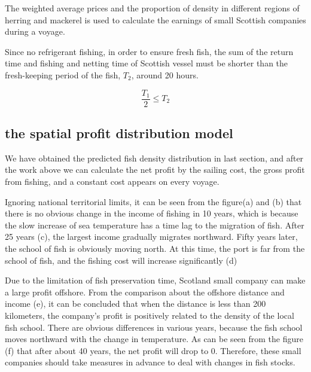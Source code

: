 \documentclass{mcmthesis}
\begin{document}
The weighted average prices and the proportion of density in different regions of herring and mackerel  is used to calculate the earnings of small Scottish companies during a voyage. 

Since no refrigerant fishing, in order to ensure fresh fish, the sum of the return time and fishing and netting time  of Scottish vessel must be shorter than the fresh-keeping period of the fish, $T_2$, around 20 hours.

\begin{equation}\label{10}
\frac{T_1}{2}\leq T_2
\end{equation}



\subsection{the spatial profit distribution model}
  We have obtained the predicted fish density distribution in last section, and after the work above we can calculate the net profit by the sailing cost, the gross profit from fishing, and a constant cost appears on every voyage.
  
Ignoring national territorial limits, it can be seen from the figure(a) and (b) that there is no obvious change in the income of fishing in 10 years, which is because the slow increase of sea temperature has a time lag to the migration of fish. After 25 years (c), the largest income gradually migrates northward. Fifty years later, the school of fish is obviously moving north. At this time, the port is far from the school of fish, and the fishing cost will increase significantly (d)

Due to the limitation of fish preservation time,  Scotland small company can make a large profit offshore. From the comparison about the offshore distance and income (e), it can be concluded that when the distance is less than 200 kilometers, the company's profit is positively related to the density of the local fish school. There are obvious differences in various years, because the fish school moves northward with the change in temperature. As can be seen from the figure (f) that after about 40 years, the net profit will drop to 0. Therefore, these small companies should take measures in advance to deal with changes in fish stocks.
\end{document}
